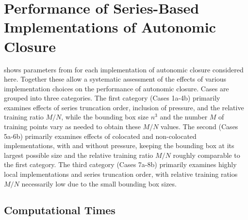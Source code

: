 \graphicspath{ {./Ch5/}  } 

%




%

\chapter{Performance of Series-Based Implementations of Autonomic Closure}
\label{ch:5}

 shows parameters from  for each implementation of autonomic closure considered here. Together these allow a systematic assessment of the effects of various implementation choices on the performance of autonomic closure. Cases are grouped into three categories. The first category (Cases 1a-4b) primarily examines effects of series truncation order, inclusion of pressure, and the relative training ratio $M/N$, while the bounding box size $n^3$ and the number $M$ of training points vary as needed to obtain these  $M/N$ values. The second (Cases 5a-6b) primarily examines effects of colocated and non-colocated implementations, with and without pressure, keeping the bounding box at its largest possible size and the relative training ratio  $M/N$ roughly comparable to the first category. The third category (Cases 7a-8b) primarily examines highly local implementations and series truncation order, with relative training ratios $M/N$  necessarily low due to the small bounding box sizes. 

\section{Computational Times} 
\label{sec:IVA}

